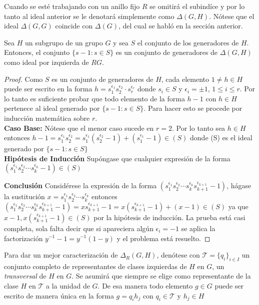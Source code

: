 Cuando se esté trabajando con un anillo fijo $R$ se omitirá el subindíce y por lo tanto al ideal anterior se le denotará simplemente como $\Delta(G,H)$. Nótese que el ideal $\Delta(G,G)$ coincide con $\Delta(G)$, del cual se habló en la sección anterior.
\begin{lema}
Sea $H$ un subgrupo de un grupo $G$ y sea $S$ el conjunto de los generadores de $H$. Entonces, el conjunto $\{ s-1 : s \in S \}$ es un conjunto de generadores de $\Delta (G,H) $ como ideal por izquierda de $RG$.
\end{lema}
\begin{proof}
Como $S$ es un conjunto de generadores de $H$, cada elemento $1 \neq h \in H$ puede ser escrito en la forma $h=s_1^{\epsilon_1} s_2^{\epsilon_2} \cdot s_r^{\epsilon_r} $ donde $s_i \in S$ y $\epsilon_i =\pm 1$, $1 \leq i \leq r$. Por lo tanto es suficiente probar que todo elemento de la forma $h-1$ con $h \in H$  pertenece al ideal generado por $\{s-1 : s \in S \}$. Para hacer esto se procede por inducción matemática sobre $r$. \\

\textbf{Caso Base:} Nótese que el menor caso sucede en $r =2$. Por lo tanto sea $h \in H$ entonces $h-1 = s_1^{\epsilon_1} s_2^{\epsilon_2} = s_1^{\epsilon_1}( s_2^{\epsilon_2} -1 ) + ( s_1^{\epsilon_1} -1 ) \in (S)  $ donde (S) es el ideal generado por $\{ s-1 : s \in S \}$ \\ 

\textbf{Hipótesis de Inducción} 
Supóngase que cualquier expresión de la forma $ (s_1^{\epsilon_1} s_2^{\epsilon_2} \cdots s_k^{\epsilon_k} -1)\in (S) $


\textbf{Conclusión}
Considérese la expresión de la forma $ (s_1^{\epsilon_1} s_2^{\epsilon_2} \cdots s_k^{\epsilon_k}s_{k+1}^{\epsilon_{k+1}} -1) $, hágase la sustitución $x =  s_1^{\epsilon_1} s_2^{\epsilon_2} \cdots s_k^{\epsilon_k} $ entonces $ (s_1^{\epsilon_1} s_2^{\epsilon_2} \cdots s_k^{\epsilon_k}s_{k+1}^{\epsilon_{k+1}} -1)  = x s_{k+1}^{\epsilon_{k+1}} -1 = x( s_{k+1}^{\epsilon_{k+1}} -1 ) + (x-1) \in (S) $ ya que $x-1, x( s_{k+1}^{\epsilon_{k+1}} -1 ) \in (S)$ por la hipótesis de inducción. La prueba está casi completa, sola falta decir que si apareciera algún $\epsilon_i = -1$ se aplica la factorización $y^{-1}-1 = y^{-1}(1-y)$ y el problema está resuelto.\qedhere
\end{proof}


Para dar un mejor caracterización de $\Delta_R (G,H)$, denótese con $\mathcal{T} = \{q_i\}_{i \in I}$ un conjunto completo de representantes de clases izquierdas de $H$ en $G$, un \textit{transversal} de $H$ en $G$. Se asumirá que siempre se elige como representante de la clase $H$ en $\mathcal{T}$ a la unidad de $G$. De esa manera todo elemento $g \in G$ puede ser escrito de manera única en la forma $g = q_ih_j$ con $q_i \in \mathcal{T}$ y $h_j \in H$


